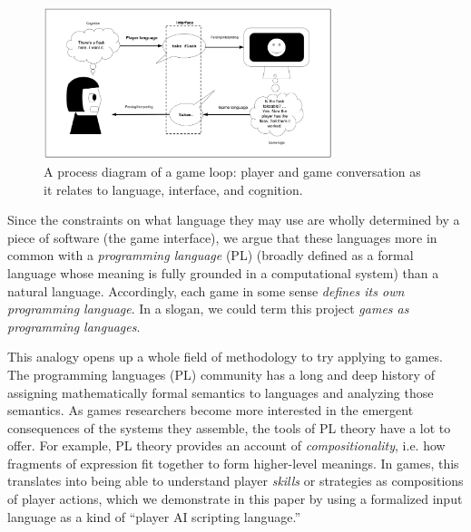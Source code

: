 \documentclass[sigconf]{acmart}
\begin{document}
\begin{figure}
\includegraphics[width=0.75\textwidth]{conversation-processing.png}
\caption{A process diagram of a game loop: player and game conversation as
it relates to language, interface, and cognition.}
\label{fig:gameloop}
\end{figure}

Since the constraints on what
language they may use are wholly determined by a piece of software (the
game interface), we argue that these languages more in common with a {\em
programming language} (PL) (broadly defined as a formal language whose meaning
is fully grounded in a computational system) than a natural language. 
Accordingly, each game in some sense {\em defines its own programming
language}. In a slogan, we could term this project {\em games as
programming languages}.


This analogy opens up a whole field of methodology to try applying to
games.  The programming languages (PL) community has a long and deep
history of assigning mathematically formal semantics to languages and
analyzing those semantics. As games researchers become more interested in
the emergent consequences of the systems they assemble, the tools of PL
theory have a lot to offer. For example, PL theory provides an account of
{\em compositionality}, i.e. how fragments of expression fit together to
form higher-level meanings. In games, this translates into being able to
understand player {\em skills} or strategies as compositions of player
actions, which we demonstrate in this paper by using a formalized input
language as a kind of ``player AI scripting language.''

\end{document}
